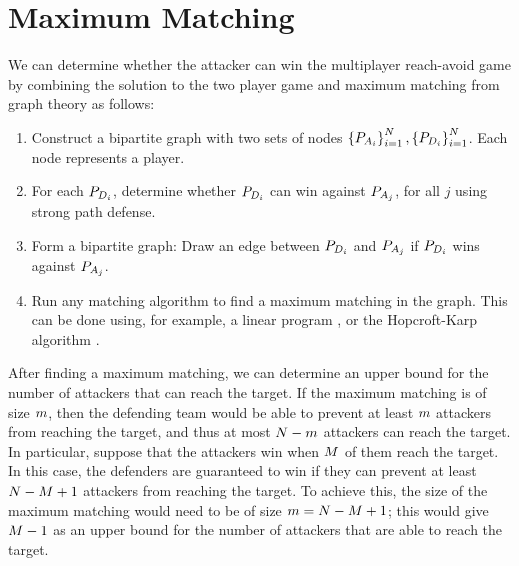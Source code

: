 \section{Maximum Matching}
\label{sec:max_match}
We can determine whether the attacker can win the multiplayer reach-avoid game by combining the solution to the two player game and maximum matching \cite{Schrjiver2004, Karpinski1998} from graph theory as follows:

\begin{enumerate}
\item Construct a bipartite graph with two sets of nodes $\left\{P_{A_{i}}\right\}_{i=1}^N,\left\{P_{D_{i}}\right\}_{i=1}^N$. Each node represents a player.
\item For each $P_{D_{i}}$, determine whether $P_{D_{i}}$ can win against $P_{A_{j}}$, for all $j$ using strong path defense. 
\item Form a bipartite graph: Draw an edge between $P_{D_{i}}$ and $P_{A_{j}}$ if $P_{D_{i}}$ wins against $P_{A_{j}}$.
\item Run any matching algorithm to find a maximum matching in the graph. This can be done using, for example, a linear program \cite{Schrjiver2004}, or the Hopcroft-Karp algorithm \cite{Karpinski1998}.
\end{enumerate}

After finding a maximum matching, we can determine an upper bound for the number of attackers that can reach the target. If the maximum matching is of size $m$, then the defending team would be able to prevent at least $m$ attackers from reaching the target, and thus at most $N-m$ attackers can reach the target. In particular, suppose that the attackers win when $M$ of them reach the target. In this case, the defenders are guaranteed to win if they can prevent at least $N-M+1$ attackers from reaching the target. To achieve this, the size of the maximum matching would need to be of size $m = N-M+1$; this would give $M-1$ as an upper bound for the number of attackers that are able to reach the target.
